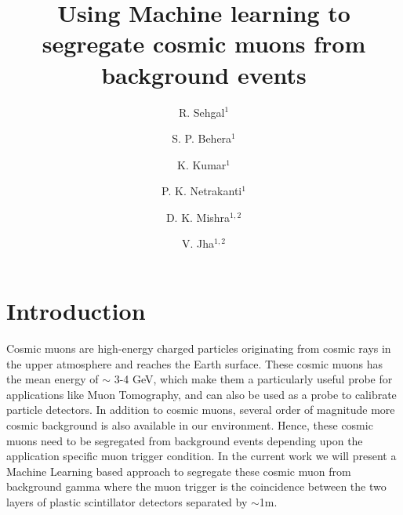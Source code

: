 \documentclass[twocolumn,amsmath,amssymb]{snp}
\begin{document}
\title{{\Large Using Machine learning to segregate cosmic muons from background events}}

\author{\large R. Sehgal$^1$}
\author{\large S. P. Behera$^1$}
\author{\large K. Kumar$^1$}
\author{\large P. K. Netrakanti$^1$}
\author{\large D. K. Mishra$^{1,2}$}
\author{\large V. Jha$^{1,2}$}

\maketitle


\section*{Introduction}
Cosmic muons are high-energy charged particles originating from cosmic rays in the upper atmosphere and reaches the Earth surface. These cosmic muons has the mean energy of $\sim$ 3-4 GeV, which make them a particularly useful probe for applications like Muon Tomography, and can also be used as a probe to calibrate particle detectors. In addition to cosmic muons, several order of magnitude more cosmic background is also available in our environment. Hence, these cosmic muons need to be segregated from background events depending upon the application specific muon trigger condition. In the current work we will present a Machine Learning based approach to segregate these cosmic muon from background gamma where the muon trigger is the coincidence between the two layers of plastic scintillator detectors separated by $\sim$1m.
\end{document}
